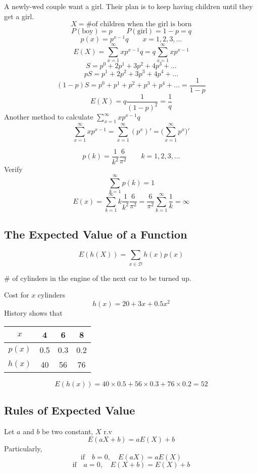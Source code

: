 \begin{exmp}
A newly-wed couple want a girl. Their plan is to keep having children until they get a girl.
\[  X=\text{\# of children when the girl is born}   \]
\[  P(\text{boy})=p \qquad P(\text{girl})=1-p=q     \]
\[	p(x)=p^{x-1}q \qquad x=1,2,3,\dots	\]
\[	E(X)=\sum_{x=1}^{\infty} xp^{x-1}q= q\sum_{x=1}^{\infty}xp^{x-1}	\]
\[	S=p^0+2p^1+3p^2+4p^3+\dots \]
\[	pS=p^1+2p^2+3p^3+4p^4+\dots \]
\[	(1-p)S=p^0+p^1+p^2+p^3+p^4+\dots=\frac{1}{1-p}\]
\[	E(X)=q\frac{1}{(1-p)^2}=\frac{1}{q}\]
Another method to calculate $\sum_{x=1}^{\infty} xp^{x-1}q$
\[	\sum_{x=1}^{\infty} xp^{x-1}=\sum_{x=1}^{\infty}(p^{x})'=\Big( \sum_{x=1}^{\infty}p^{x} \Big)'	\]
\end{exmp}

\begin{exmp}
\[	p(k)=\frac{1}{k^2}\frac{6}{\pi^2}	\qquad k=1,2,3,\dots\]
Verify \[\sum_{k=1}^{\infty} p(k)=1\]
\[E(x)=\sum_{k=1}^{\infty} k\frac{1}{k^2}\frac{6}{\pi^2}		=\frac{6}{\pi^2}\sum_{k=1}^{\infty}\frac{1}{k}=\infty	\]
\end{exmp}


\subsection{The Expected Value of a Function}
\begin{prop}
\[E(h(X))=\sum_{x\in \mathcal{D}}h(x)p(x)\]
\end{prop}

\begin{exmp}
\# of cylinders in the engine of the next car to be turned up.

Cost for $x$ cylinders
\[	h(x)=20+3x+0.5 x^2		\]
History shows that 
\begin{center}
  \begin{tabular}{c|ccc}
  \hline
  $x$  & 4 & 6 & 8 \\
  \hline
  $p(x)$  & 0.5 & 0.3  & 0.2  \\
  $h(x)$  & 40 & 56 & 76 \\
  \hline
  \end{tabular}
\end{center}

  
  \vspace{4mm}
 \[	E(h(x))=40\times0.5 +56\times 0.3+76\times 0.2 = \boxed{52}\]
\end{exmp}


\subsection{Rules of Expected Value}
\begin{prop}
Let $a$ and $b$ be two constant, $X$ r.v
\[E(aX+b)=aE(X)+b\]
Particularly,
\[\text{if} \quad b=0, \quad E(aX)=aE(X)\]
\[\text{if} \quad a=0, \quad E(X+b)=E(X)+b\]
\end{prop}

